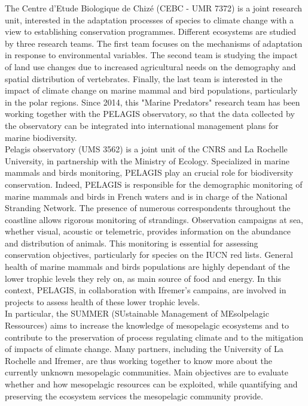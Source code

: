 
The Centre d'Etude Biologique de Chizé (CEBC - UMR 7372) is a joint research unit, interested in the adaptation processes of species to climate change with a view to establishing conservation programmes. Different ecosystems are studied by three research teams. The first team focuses on the mechanisms of adaptation in response to environmental variables. The second team is studying the impact of land use changes due to increased agricultural needs on the demography and spatial distribution of vertebrates. Finally, the last team is interested in the impact of climate change on marine mammal and bird populations, particularly in the polar regions. Since 2014, this "Marine Predators" research team has been working together with the PELAGIS observatory, so that the data collected by the observatory can be integrated into international management plans for marine biodiversity.  \\

Pelagis observatory (UMS 3562) is a joint unit of the CNRS and La Rochelle University, in partnership with the Ministry of Ecology. Specialized in marine mammals and birds monitoring, PELAGIS play an crucial role for biodiversity conservation. Indeed, PELAGIS is responsible for the demographic monitoring of marine mammals and birds in French waters and is in charge of the National Stranding Network. The presence of numerous correspondents throughout the coastline allows rigorous monitoring of strandings. Observation campaigns at sea, whether visual, acoustic or telemetric, provides information on the abundance and distribution of animals. This monitoring is essential for assessing conservation objectives, particularly for species on the IUCN red lists. General health of marine mammals and birds populations are highly dependant of the lower trophic levels they rely on, as main source of food and energy. In this context, PELAGIS, in collaboration with Ifremer's campains, are involved in projects to assess health of these lower trophic levels. \\

In particular, the SUMMER (SUstainable Management of MEsolpelagic Ressources) aims to increase the knowledge of mesopelagic ecosystems and to contribute to the preservation of process regulating climate and to the mitigation of impacts of climate change. Many partners, including the University of La Rochelle and Ifremer, are thus working together to know more about the currently unknown mesopelagic communities. Main objectives are to evaluate whether and how mesopelagic resources can be exploited, while quantifying and preserving the ecosystem services the mesopelagic community provide.